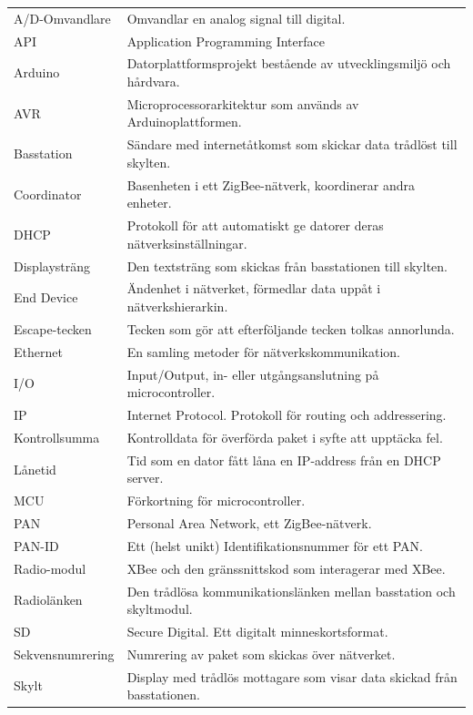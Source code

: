 \documentclass[a4paper,11pt]{article}
\begin{document}
\begin{table}[h!]
	\begin{tabular}{|l|l|}
A/D-Omvandlare & Omvandlar en analog signal till digital.\\
API & Application Programming Interface\\
Arduino & Datorplattformsprojekt bestående av utvecklingsmiljö och hårdvara.\\	
AVR & Microprocessorarkitektur som används av Arduinoplattformen.\\
Basstation & Sändare med internetåtkomst som skickar data trådlöst till skylten.\\
Coordinator & Basenheten i ett ZigBee-nätverk, koordinerar andra enheter.\\
DHCP & Protokoll för att automatiskt ge datorer deras nätverksinställningar.\\
Displaysträng & Den textsträng som skickas från basstationen till skylten.\\
End Device & Ändenhet i nätverket, förmedlar data uppåt i nätverkshierarkin.\\
Escape-tecken & Tecken som gör att efterföljande tecken tolkas annorlunda.\\
Ethernet & En samling metoder för nätverkskommunikation.\\
I/O & Input/Output, in- eller utgångsanslutning på microcontroller.\\
IP & Internet Protocol. Protokoll för routing och addressering.\\
Kontrollsumma & Kontrolldata för överförda paket i syfte att upptäcka fel.\\
Lånetid & Tid som en dator fått låna en IP-address från en DHCP server.\\
MCU & Förkortning för microcontroller. \\
PAN & Personal Area Network, ett ZigBee-nätverk.\\
PAN-ID & Ett (helst unikt) Identifikationsnummer för ett PAN.\\
Radio-modul & XBee och den gränssnittskod som interagerar med XBee.\\
Radiolänken & Den trådlösa kommunikationslänken mellan basstation och skyltmodul.\\
SD & Secure Digital. Ett digitalt minneskortsformat.\\
Sekvensnumrering & Numrering av paket som skickas över nätverket.\\
Skylt & Display med trådlös mottagare som visar data skickad från basstationen.\\

\end{tabular}
\end{table}
\end{document}
